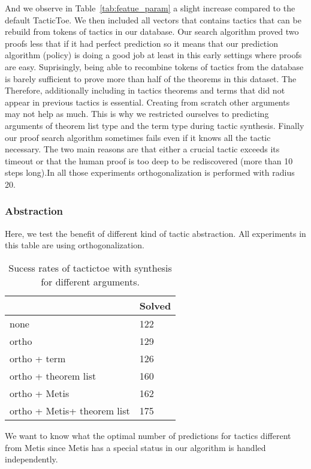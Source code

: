 \documentclass[runningheads,a4paper,draft]{svjour3}
\def\metis{\textsf{Metis}\xspace}
\def\tactictoe{\textsf{TacticToe}\xspace}
\newcommand{\ra}[1]{\renewcommand{\arraystretch}{#1}}
\begin{document}
And we observe in Table~\ref{tab:featue_param} a 
slight increase compared to the default \tactictoe. We then included all 
vectors that contains tactics that can be rebuild from tokens of
tactics in our database. 
Our search algorithm proved two proofs less that if it had perfect prediction 
so it means that our prediction algorithm (policy) is doing a good  job at 
least in this early settings where proofs are easy. 
Suprisingly, being able to recombine tokens of tactics from the database is 
barely sufficient to prove more than half of the theorems in this dataset. The 
Therefore, additionally including in tactics theorems and terms that did not 
appear in previous tactics is essential. Creating from scratch other arguments 
may not help as much. This is why we restricted ourselves to predicting 
arguments of theorem list type and the term type during tactic synthesis. 
Finally our proof search algorithm sometimes fails even if it knows all the 
tactic necessary. The two main reasons are that either a crucial tactic exceeds 
its timeout or that the human proof is too deep to be rediscovered (more than 
10 steps long).In all those experiments orthogonalization is performed with 
radius 20.

\subsubsection{Abstraction}
Here, we test the benefit of different kind of tactic abstraction.
All experiments in this table are using orthogonalization.

\begin{table}[t]
\centering\ra{1.3}
\small
\begin{tabular}{ll}
\toprule
  & Solved \\
\midrule
 none & 122\\
 ortho & 129\\
 ortho + term & 126\\    
 ortho + theorem list & 160\\
 ortho + \metis & 162\\
 ortho + \metis + theorem list & 175\\ 
\bottomrule
\end{tabular}
\caption{\label{tab:cfot_param}
Sucess rates of tactictoe with synthesis for different arguments.}
\end{table}
We want to know what the optimal number of predictions for tactics different 
from \metis since \metis has a special status in our algorithm is handled 
independently.
\end{document}

